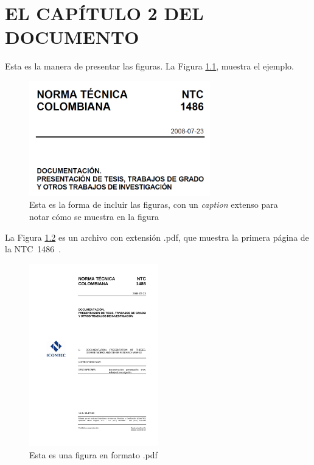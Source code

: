 \chapter{EL CAPÍTULO 2 DEL DOCUMENTO}
%
\lipsum[1]

Esta es la manera de presentar las figuras. La Figura \ref{figuraNorma}, muestra el ejemplo.

\begin{figure}[ht]
    \vspace{\baselineskip}
    \caption{Esta es la forma de incluir las figuras, con un \emph{caption} extenso para notar cómo se muestra en la figura}
    \label{figuraNorma}
    \centering
    \includegraphics[width=0.7\textwidth]{Cap_2/Fig_Cap_2/Norma}
    \vspace{\baselineskip}
\end{figure}

La Figura \ref{figuraPortada} es un archivo con extensión .pdf, que muestra la primera página de la NTC~1486~\cite{NTC1486}.

\begin{figure}[ht]
    \vspace{\baselineskip}
    \caption{Esta es una figura en formato .pdf}
    \label{figuraPortada}
    \centering
    \includegraphics[width=0.5\textwidth]{Cap_2/Fig_Cap_2/Portada}
    \vspace{\baselineskip}
\end{figure}

